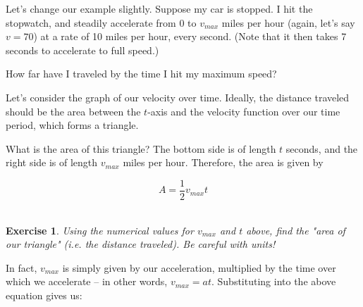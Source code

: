 \documentclass{article}
\newtheorem{exercise}{\\ \bf Exercise}
\begin{document}






Let's change our example slightly. Suppose my car is stopped. I hit the stopwatch, and steadily accelerate from $0$ to $v_{max}$ miles per hour (again, let's say $v = 70$) at a rate of 10 miles per hour, every second. (Note that it then takes 7 seconds to accelerate to full speed.) 

How far have I traveled by the time I hit my maximum speed? %

Let's consider the graph of our velocity over time. Ideally, the distance traveled should be the area between the $t$-axis and the velocity function over our time period, which forms a triangle. 


What is the area of this triangle? The bottom side is of length $t$ seconds, and the right side is of length $v_{max}$ miles per hour. Therefore, the area is given by 

\begin{equation}
A = \frac{1}{2} v_{max} t
\end{equation}


\begin{exercise}
\label{const-velocity-numerical}
Using the numerical values for $v_{max}$ and $t$ above, find the "area of our triangle" (i.e. the distance traveled). Be careful with units!
\end{exercise}

In fact, $v_{max}$ is simply given by our acceleration, multiplied by the time over which we accelerate -- in other words, $v_{max} = at$. Substituting into the above equation gives us:
\end{document}
